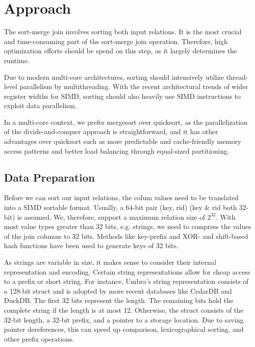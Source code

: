 \section{Approach}
\label{sec:approach}


The sort-merge join involves sorting both input relations. It is the most crucial and 
time-consuming part of the sort-merge join operation. Therefore, high optimization efforts should
be spend on this step, as it largely determines the runtime. 

Due to modern multi-core 
architectures, sorting should intensively utilize thread-level parallelism by multithreading.
With the recent architectural trends of wider register widths for SIMD, sorting should also
heavily use SIMD instructions to exploit data parallelism. 

In a multi-core context, we prefer mergesort over quicksort, as the parallelization of the divide-and-conquer approach
is straightforward, and it has other advantages over quicksort such as more predictable and 
cache-friendly memory access patterns and better load balancing through equal-sized partitioning. 

\subsection{Data Preparation}
Before we can sort our input relations, the colum values need to be translated into a SIMD sortable
format. Usually, a 64-bit pair (key, rid) (key \& rid both 32-bit) is assumed. We, therefore,
support a maximum relation size of $2^{32}$. With most value types greater
than 32 bits, e.g. strings, we need to compress the values of the join columns to 32 bits. Methods like 
key-prefix \cite{chris_nyberg__1994} and XOR- and shift-based hash functions \cite{1319989} have 
been used to generate keys of 32 bits.

As strings are variable in size, it makes sense to consider their internal representation and
encoding. Certain string representations allow for cheap access to a prefix or short string.
For instance, Umbra's string representation \cite{DBLP:conf/cidr/NeumannF20} consists of a 128-bit 
struct and is adopted by more recent databases like CedarDB and DuckDB. The first 32 bits represent 
the length. The remaining bits hold
the complete string if the length is at most 12. Otherwise, the struct consists of the 32-bit
length, a 32-bit prefix, and a pointer to a storage location. Due to saving pointer dereferences,
this can speed up comparison, lexicographical sorting, and other prefix operations.



